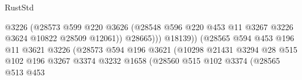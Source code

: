 \begin{lexlean}{RustStd}
\begin{coremodule}
{\begin{coremodule}
{{{{{{{{{{{{{{{{{{{{{{{{{                                                    @3226
                                                    (@28573
                                                      @599
                                                      @220
                                                      @3626
                                                      (@28548
                                                        @596
                                                        @220
                                                        @453
                                                        @11
                                                        @3267
                                                        @3226
                                                        @3624
                                                        @10822
                                                        @28509
                                                        @12061))
                                                    @28665)))
                                              @18139))
                                          (@28565
                                            @594
                                            @453
                                            @196
                                            @11
                                            @3621
                                            @3226
                                            (@28573
                                              @594
                                              @196
                                              @3621
                                              (@10298
                                                @21431
                                                @3294
                                                @28
                                                @515
                                                @102
                                                @196
                                                @3267
                                                @3374
                                                @3232
                                                @1658
                                                (@28560
                                                  @515
                                                  @102
                                                  @3374
                                                  (@28565
                                                    @513
                                                    @453
}}}}}}}}}}}}}}}}}}}}}}}}}
\end{coremodule}}
\end{coremodule}
\end{lexlean}
